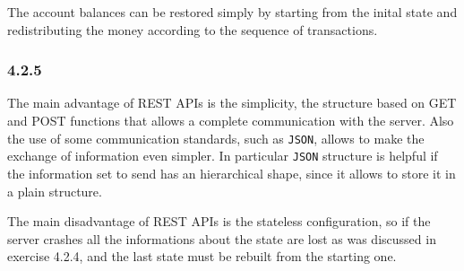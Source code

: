 \documentclass[11pt]{article}
\begin{document}
The account balances can be restored simply by starting from the inital
state and redistributing the money according to the sequence of
transactions.

\hypertarget{section}{%
    \subsubsection*{4.2.5}\label{section}}

The main advantage of REST APIs is the simplicity, the structure based
on GET and POST functions that allows a complete communication with the
server. Also the use of some communication standards, such as
\texttt{JSON}, allows to make the exchange of information even simpler.
In particular \texttt{JSON} structure is helpful if the information set
to send has an hierarchical shape, since it allows to store it in a
plain structure.

The main disadvantage of REST APIs is the stateless configuration, so if
the server crashes all the informations about the state are lost as was
discussed in exercise 4.2.4, and the last state must be rebuilt from the
starting one.


\end{document}
